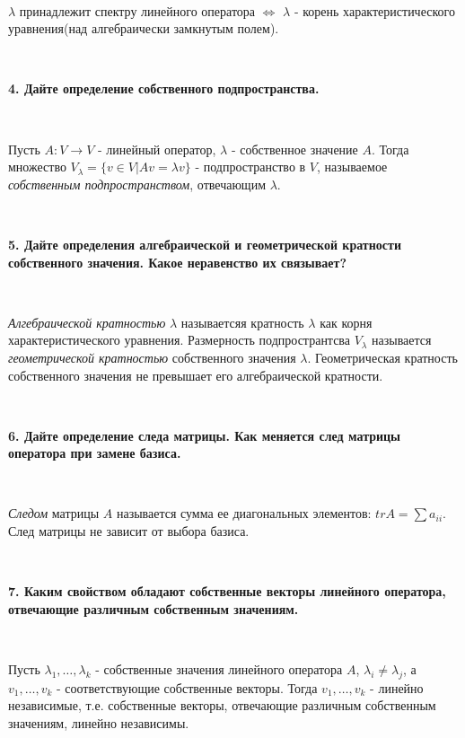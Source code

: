 \documentclass{article}
\begin{document}
	$\;$
	{
		\setlength{\parindent}{0.4cm}
		\hangindent=0.4cm
		
		$\lambda$ принадлежит спектру линейного оператора $\Leftrightarrow$ $\lambda$ - корень характеристического уравнения(над алгебраически замкнутым полем).
		
		$\;$
		\setlength{\parindent}{0cm}
		\hangindent=0cm
	}
	
	\textbf{4. Дайте определение собственного подпространства.}
	
	$\;$
	{
		\setlength{\parindent}{0.4cm}
		\hangindent=0.4cm
		
		Пусть $A:V\rightarrow V$ - линейный оператор, $\lambda$ - собственное значение $A$. Тогда множество $V_\lambda = \{v\in V| Av=\lambda v\}$ - подпространство в $V$, называемое \textit{собственным подпространством}, отвечающим $\lambda$.
		
		$\;$
		\setlength{\parindent}{0cm}
		\hangindent=0cm
	}
	
	\textbf{5. Дайте определения алгебраической и геометрической кратности собственного значения. Какое неравенство их связывает?}
	
	$\;$
	{
		\setlength{\parindent}{0.4cm}
		\hangindent=0.4cm
		
		\textit{Алгебраической кратностью} $\lambda$ называетсяя кратность $\lambda$ как корня характеристического уравнения. Размерность подпространтсва $V_\lambda$ называется \textit{геометрической кратностью}
		собственного значения $\lambda$. Геометрическая кратность собственного значения не превышает его алгебраической кратности.
		
		$\;$
		\setlength{\parindent}{0cm}
		\hangindent=0cm
	}
	
	\textbf{6. Дайте определение следа матрицы. Как меняется след матрицы оператора при замене базиса.}
	
	$\;$
	{
		\setlength{\parindent}{0.4cm}
		\hangindent=0.4cm
		
		\textit{Следом} матрицы $A$ называется сумма ее диагональных элементов: $tr A = \sum a_ { ii }$. След матрицы не зависит от выбора базиса.
		
		$\;$
		\setlength{\parindent}{0cm}
		\hangindent=0cm
	}
	
	\textbf{7. Каким свойством обладают собственные векторы линейного оператора, отвечающие различным собственным значениям.}
	
	$\;$
	{
		\setlength{\parindent}{0.4cm}
		\hangindent=0.4cm
		
		Пусть $\lambda_1,\dots,\lambda_k$ - собственные значения линейного оператора $A$, $\lambda_i \not = \lambda_j$, а $v_1, \dots, v_k$ - соответствующие собственные векторы. Тогда $v_1, \dots, v_k$ - линейно независимые, т.е. собственные векторы, отвечающие различным собственным значениям, линейно независимы.
		
		$\;$
		\setlength{\parindent}{0cm}
		\hangindent=0cm
	}
	
\end{document}
